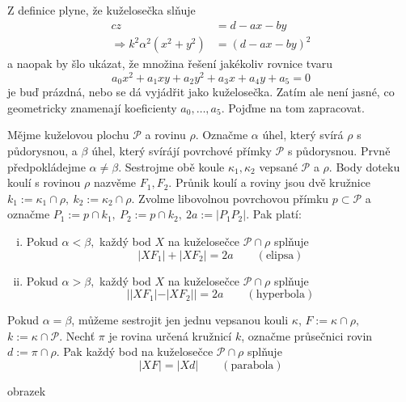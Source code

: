 Z definice plyne, že kuželosečka slňuje
\begin{align*}
	cz&=d-ax-by \\
	\Rightarrow  k^{2}\alpha^{2}(x^{2}+y^{2})&=(d-ax-by)^{2}
\end{align*}
a naopak by šlo ukázat, že množina řešení jakékoliv rovnice tvaru
\begin{equation*}
  a_0x^{2}+a_1xy+a_2y^{2}+a_3x+a_4y+a_5=0
\end{equation*}
je buď prázdná, nebo se dá vyjádřit jako kuželosečka. Zatím ale není jasné, co geometricky znamenají koeficienty $a_0,\hdots,a_5.$ Pojďme na tom zapracovat.

\begin{věta}
	Mějme kuželovou plochu $\mathcal{P}$ a rovinu $\rho$. Označme $\alpha$ úhel, který svírá $\rho$ s půdorysnou, a $\beta$ úhel, který svírájí povrchové přímky $\mathcal{P}$ s půdorysnou. Prvně předpokládejme $\alpha\neq \beta.$ Sestrojme obě koule $\kappa_1,\kappa_2$ vepsané $\mathcal{P}$ a $\rho$. Body doteku koulí s rovinou $\rho$ nazvěme $F_1, F_2.$ Průnik koulí a roviny jsou dvě kružnice $k_1:=\kappa_1\cap\rho,\ k_2:=\kappa_2\cap\rho$. Zvolme libovolnou povrchovou přímku $p\subset \mathcal{P}$ a označme $P_1:=p\cap k_1,\ P_2:=p\cap k_2,\ 2a:=|P_1P_2|.$ Pak platí:
  \begin{enumerate}[(i)]
	  \item Pokud $\alpha<\beta,$ každý bod $X$ na kuželosečce $\mathcal{P}\cap \rho$ splňuje
\begin{equation*}
	|XF_1|+|XF_2|=2a \qquad (\text{elipsa})
\end{equation*}
	\item Pokud $\alpha>\beta,$ každý bod $X$ na kuželosečce $\mathcal{P}\cap \rho$ splňuje
\begin{equation*}
	||XF_1|-|XF_2||=2a \qquad (\text{hyperbola})
\end{equation*}
\end{enumerate}
Pokud $\alpha=\beta$, můžeme sestrojit jen jednu vepsanou kouli $\kappa$, $F:=\kappa\cap\rho,$ $k:=\kappa\cap \mathcal{P}$. Nechť $\pi$ je rovina určená kružnicí $k$, označme průsečnici rovin $d:=\pi\cap \rho.$ Pak každý bod na kuželosečce $\mathcal{P}\cap \rho$ splňuje
\begin{equation*}
	|XF|=|Xd| \qquad (\text{parabola})
\end{equation*}
\end{věta}
\begin{Todo}
  obrazek
\end{Todo}
